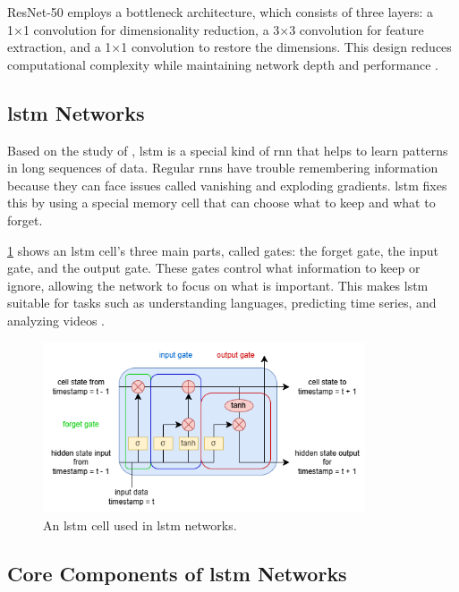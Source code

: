 \begin{refsection}
ResNet-50 employs a bottleneck architecture, which consists of three layers: a 1×1 convolution for dimensionality reduction, a 3×3 convolution for feature extraction, and a 1×1 convolution to restore the dimensions. This design reduces computational complexity while maintaining network depth and performance \cite{he2015deepresiduallearningimage}.

\subsection{\gls{lstm} Networks}

Based on the study of \citeauthor{10.1162/neco.1997.9.1.1} \citeyear{10.1162/neco.1997.9.1.1}, \gls{lstm} is a special kind of \gls{rnn} that helps to learn patterns in long sequences of data. Regular \gls{rnn}s have trouble remembering information because they can face issues called vanishing and exploding gradients. \gls{lstm} fixes this by using a special memory cell that can choose what to keep and what to forget.

\ref{fig:secondFig} shows an \gls{lstm} cell’s three main parts, called gates: the forget gate, the input gate, and the output gate. These gates control what information to keep or ignore, allowing the network to focus on what is important. This makes \gls{lstm} suitable for tasks such as understanding languages, predicting time series, and analyzing videos \cite{10.1162/neco.1997.9.1.1}.

\begin{figure}[H]
    \centering
	\includegraphics[width=0.85\textwidth]{figures/lstm.png} 
	\caption[An \gls{lstm} Cell]{An \gls{lstm} cell used in \gls{lstm} networks.}
	\label{fig:secondFig}
\end{figure}

\subsection{Core Components of \gls{lstm} Networks}


\end{refsection}
